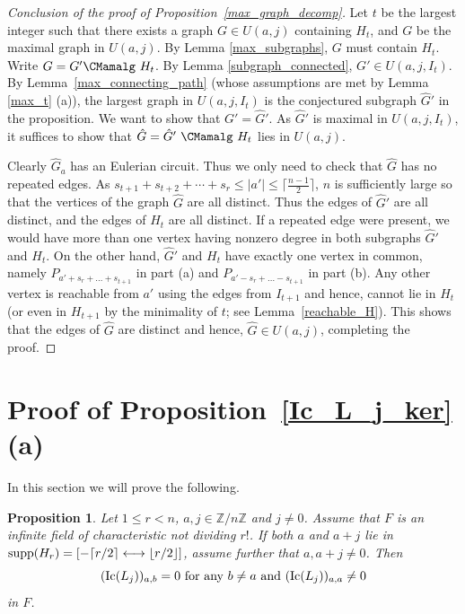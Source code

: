 \documentclass{amsproc}
\newtheorem{proposition}[theorem]{Proposition}
\theoremstyle{definition}
\theoremstyle{remark}
\numberwithin{equation}{section}
\newcommand{\Ic}{{\rm Ic}}
\newcommand{\supp}{{\rm supp}}
\newcommand{\interval}{\longleftrightarrow}
\begin{document}
\begin{proof}[Conclusion of the proof of Proposition~\ref{max_graph_decomp}]
Let $t$ be the largest integer such that there exists a graph $G\in U(a,j)$ containing $H_t$, and $G$ be the maximal graph in $U(a,j)$. By Lemma \ref{max_subgraphs}, $G$ must contain $H_t$. Write $G=G'  \CMamalg\ H_t$. By Lemma \ref{subgraph_connected}, $G'\in U(a,j,I_t)$. 
By Lemma~\ref{max_connecting_path} (whose assumptions are met by Lemma \ref{max_t} (a)), the largest graph in $U(a,j,I_t)$ is 
the conjectured subgraph $\hat G'$ in the proposition. We want to show that $G'=\hat G'$. 
As $\hat G'$ is maximal in $U(a,j,I_t)$, it suffices to show that $\hat G=\hat G'\ \CMamalg\ H_t$ lies in $U(a,j)$.

Clearly $\hat G_a$ has an Eulerian circuit. Thus we only need to check that $\hat G$ has no repeated edges. 
As $s_{t+1}+s_{t+2}+\cdots +s_r\le |a'|\le \lceil \frac{n-1}{2} \rceil$, $n$ is sufficiently large so that the vertices of the graph $\hat G$ 
are all distinct. Thus the edges of $\hat G'$ are all distinct, and the edges of $H_t$ are all distinct. 
If a repeated edge were present, we would have more than one vertex having nonzero degree in both subgraphs $\hat G'$ and $H_t$. 
On the other hand, $\hat G'$ and $H_t$ have exactly one vertex in common, namely $P_{a' + s_r + \ldots + s_{t+1}}$ in part (a) and
$P_{a' - s_r + \ldots - s_{t+1}}$ in part (b). Any other vertex is reachable from $a'$ using the edges from $I_{t + 1}$ and hence,
cannot lie in $H_t$ (or even in $H_{t+1}$ by the minimality of $t$; see Lemma~\ref{reachable_H}). This shows that
the edges of $\hat G$ are distinct and hence, $\hat G\in U(a,j)$, completing the proof.
\end{proof}


\section{Proof of Proposition~\ref{Ic_L_j_ker}(a)}
\label{section_j_nonzero}

In this section we will prove the following.

\begin{proposition}\label{Ic_L_j_ker_j_neq_0} 
Let $1 \leqslant r < n$, $a, j \in \mathbb Z / n \mathbb Z$ and $j \neq 0$. Assume that $F$ is an infinite field of characteristic not dividing
$r!$. If both $a$ and $a+j$ lie in $\supp(H_r) = [-\lceil r/2 \rceil\interval \lfloor r/2 \rfloor]$, assume further that $a, a+j \neq 0$. Then
\[ \text{$(\Ic(L_j))_{a,b}= 0$ for any $b\neq a$ and
$(\Ic(L_j))_{a,a}\neq 0$} \]
in $F$.
\end{proposition}
\end{document}

